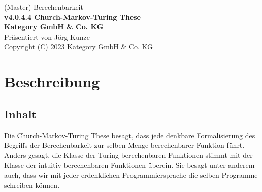 \documentclass[a4paper]{amsart}
\theoremstyle{definition}
\begin{document}
\begin{titlepage}
\centering
{\huge
(Master) Berechenbarkeit\\[1cm]
\textbf{v4.0.4.4 Church-Markov-Turing These}
}\\[1cm]

\textbf{Kategory GmbH \& Co. KG}\\
Präsentiert von Jörg Kunze\\
Copyright (C) 2023 Kategory GmbH \& Co. KG

\end{titlepage}

%

\newpage

\section*{Beschreibung}

\subsection*{Inhalt}
Die Church-Markov-Turing These besagt, dass jede denkbare Formalisierung des Begriffs der Berechenbarkeit zur selben Menge berechenbarer Funktion führt. Anders gesagt, die Klasse der Turing-berechenbaren Funktionen stimmt mit der Klasse der intuitiv berechenbaren Funktionen überein. Sie besagt unter anderem auch, dass wir mit jeder erdenklichen Programmiersprache die selben Programme schreiben können. 
\end{document}
